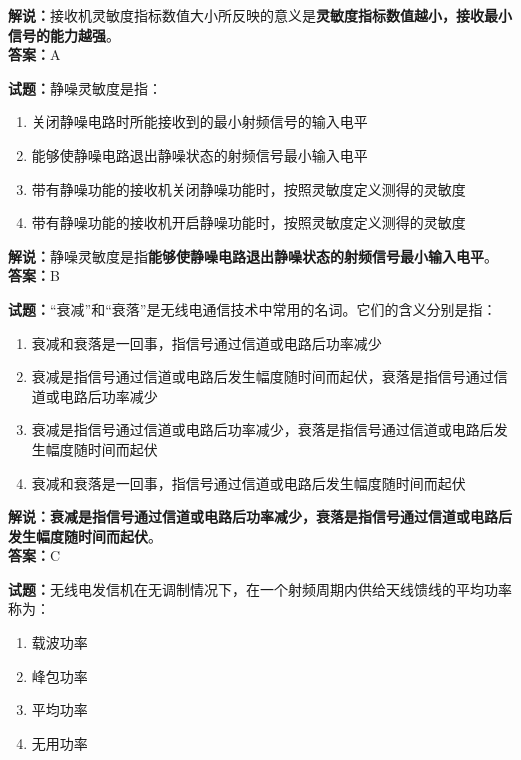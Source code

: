 \documentclass{ctexbook}
\begin{document}
\noindent\textbf{解说：}接收机灵敏度指标数值大小所反映的意义是\textbf{灵敏度指标数值越小，接收最小信号的能力越强}。\\\noindent\textbf{答案：}A%


\bigskip


\noindent\textbf{试题：}静噪灵敏度是指：

\begin{enumerate}[leftmargin=3em]
	\item 关闭静噪电路时所能接收到的最小射频信号的输入电平
	\item 能够使静噪电路退出静噪状态的射频信号最小输入电平
	\item 带有静噪功能的接收机关闭静噪功能时，按照灵敏度定义测得的灵敏度
	\item 带有静噪功能的接收机开启静噪功能时，按照灵敏度定义测得的灵敏度
\end{enumerate}

\noindent\textbf{解说：}静噪灵敏度是指\textbf{能够使静噪电路退出静噪状态的射频信号最小输入电平}。\\\noindent\textbf{答案：}B%


\bigskip


\noindent\textbf{试题：}“衰减”和“衰落”是无线电通信技术中常用的名词。它们的含义分别是指：

\begin{enumerate}[leftmargin=3em]
	\item 衰减和衰落是一回事，指信号通过信道或电路后功率减少
	\item 衰减是指信号通过信道或电路后发生幅度随时间而起伏，衰落是指信号通过信道或电路后功率减少
	\item 衰减是指信号通过信道或电路后功率减少，衰落是指信号通过信道或电路后发生幅度随时间而起伏
	\item 衰减和衰落是一回事，指信号通过信道或电路后发生幅度随时间而起伏
\end{enumerate}

\noindent\textbf{解说：}\textbf{衰减是指信号通过信道或电路后功率减少，衰落是指信号通过信道或电路后发生幅度随时间而起伏}。\\\noindent\textbf{答案：}C%


\bigskip


\noindent\textbf{试题：}无线电发信机在无调制情况下，在一个射频周期内供给天线馈线的平均功率称为：

\begin{enumerate}[leftmargin=3em]
	\item 载波功率
	\item 峰包功率
	\item 平均功率
	\item 无用功率
\end{enumerate}
\end{document}
